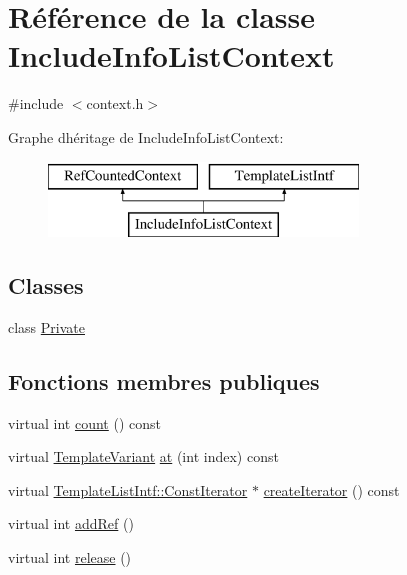 \hypertarget{class_include_info_list_context}{}\section{Référence de la classe Include\+Info\+List\+Context}
\label{class_include_info_list_context}


{\ttfamily \#include $<$context.\+h$>$}

Graphe d\textquotesingle{}héritage de Include\+Info\+List\+Context\+:\begin{figure}[H]
\begin{center}
\leavevmode
\includegraphics[height=2.000000cm]{class_include_info_list_context}
\end{center}
\end{figure}
\subsection*{Classes}
\begin{DoxyCompactItemize}
\item 
class \hyperlink{class_include_info_list_context_1_1_private}{Private}
\end{DoxyCompactItemize}
\subsection*{Fonctions membres publiques}
\begin{DoxyCompactItemize}
\item 
virtual int \hyperlink{class_include_info_list_context_a2cbeea25758a243be0ea2d9fa9a6bae8}{count} () const 
\item 
virtual \hyperlink{class_template_variant}{Template\+Variant} \hyperlink{class_include_info_list_context_aba0ef8eff56202965f900405ff11afea}{at} (int index) const 
\item 
virtual \hyperlink{class_template_list_intf_1_1_const_iterator}{Template\+List\+Intf\+::\+Const\+Iterator} $\ast$ \hyperlink{class_include_info_list_context_aade587353749ad5f9b75ff79de884a12}{create\+Iterator} () const 
\item 
virtual int \hyperlink{class_include_info_list_context_ab45ef3751c5ce2e342a23d8a240cee07}{add\+Ref} ()
\item 
virtual int \hyperlink{class_include_info_list_context_a8791d673ef9ceb58785f1bf729d53ed1}{release} ()
\end{DoxyCompactItemize}
